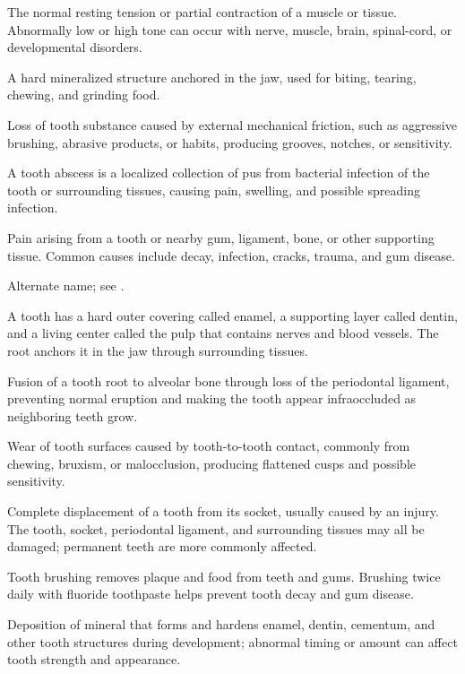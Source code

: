  The normal resting tension or partial contraction of a muscle or tissue. Abnormally low or high tone can occur with nerve, muscle, brain, spinal-cord, or developmental disorders.

 A hard mineralized structure anchored in the jaw, used for biting, tearing, chewing, and grinding food.

 Loss of tooth substance caused by external mechanical friction, such as aggressive brushing, abrasive products, or habits, producing grooves, notches, or sensitivity.

 A tooth abscess is a localized collection of pus from bacterial infection of the tooth or surrounding tissues, causing pain, swelling, and possible spreading infection.

 Pain arising from a tooth or nearby gum, ligament, bone, or other supporting tissue. Common causes include decay, infection, cracks, trauma, and gum disease.

 Alternate name; see .

 A tooth has a hard outer covering called enamel, a supporting layer called dentin, and a living center called the pulp that contains nerves and blood vessels. The root anchors it in the jaw through surrounding tissues.

 Fusion of a tooth root to alveolar bone through loss of the periodontal ligament, preventing normal eruption and making the tooth appear infraoccluded as neighboring teeth grow.

 Wear of tooth surfaces caused by tooth-to-tooth contact, commonly from chewing, bruxism, or malocclusion, producing flattened cusps and possible sensitivity.

 Complete displacement of a tooth from its socket, usually caused by an injury. The tooth, socket, periodontal ligament, and surrounding tissues may all be damaged; permanent teeth are more commonly affected.

 Tooth brushing removes plaque and food from teeth and gums. Brushing twice daily with fluoride toothpaste helps prevent tooth decay and gum disease.

 Deposition of mineral that forms and hardens enamel, dentin, cementum, and other tooth structures during development; abnormal timing or amount can affect tooth strength and appearance.

